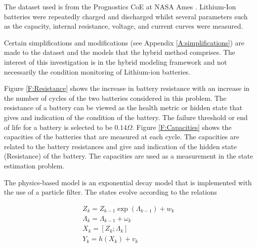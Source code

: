 





The dataset used is from the Prognostics CoE at NASA Ames \cite{Saha2007}. Lithium-Ion batteries were repeatedly charged and discharged whilst several parameters such as the capacity, internal resistance, voltage, and current curves were measured. 

Certain simplifications and modifications (see Appendix \ref{A:simplifications}) are made to the dataset and the models that the hybrid method comprises. The interest of this investigation is in the hybrid modeling framework and not necessarily the condition monitoring of Lithium-ion batteries. 

Figure \ref{F:Resistance} shows the increase in battery resistance with an increase in the number of cycles of the two batteries considered in this problem. The resistance of a battery can be viewed as the health metric or hidden state that gives and indication of the condition of the battery. The failure threshold or end of life for a battery is selected to be $0.14\Omega$. Figure \ref{F:Capacities} shows the capacities of the batteries that are measured at each cycle. The capacities are related to the battery resistances and give and indication of the hidden state (Resistance) of the battery. The capacities are used as a measurement in the state estimation problem. 

The physics-based model is an exponential decay model that is implemented with the use of a particle filter. The states evolve according to the relations 

\begin{equation}
\begin{array}{l}{Z_{k}=Z_{k-1} \exp \left(\Lambda_{k-1}\right)+w_{k}} \\ {\Lambda_{k}=\Lambda_{k-1}+\omega_{k}} \\ {X_{k}=\left[Z_{k} ; \Lambda_{k}\right]} \\ {Y_{k}=h\left(X_{k}\right)+v_{k}}\end{array}
\label{eq:decay}
\end{equation}

